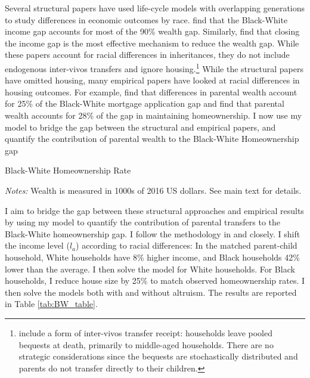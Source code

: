 \documentclass[12pt]{article}
\begin{document}
Several structural papers have used life-cycle models with overlapping generations to study differences in economic outcomes by race. \cite{Ashman2020} find that the Black-White income gap accounts for most of the 90\% wealth gap. Similarly, \cite{aliprantis2022dynamics} find that closing the income gap is the most effective mechanism to reduce the wealth gap. While these papers account for racial differences in inheritances, they do not include endogenous inter-vivos transfers and ignore housing.\footnote{\cite{aliprantis2022dynamics} include a form of inter-vivos transfer receipt: households leave pooled bequests at death, primarily to middle-aged households. There are no strategic considerations since the bequests are stochastically distributed and parents do not transfer directly to their children.} While the structural papers have omitted housing, many empirical papers have looked at racial differences in housing outcomes. For example, \cite{charles2002transition} find that differences in parental wealth account for 25\% of the Black-White mortgage application gap and \cite{bond2021role} find that parental wealth accounts for 28\% of the gap in maintaining homeownership. I now use my model to bridge the gap between the structural and empirical papers, and quantify the contribution of parental wealth to the Black-White Homeownership gap
\begin{table}
	\center
\begin{threeparttable}[tb]
				\singlespacing
		\caption{Black-White Homeownership Rate}\label{tab:BW_table}
		
		\footnotesize
		\textit{Notes:} Wealth is measured in 1000s of 2016 US dollars. See main text for details.
	\end{threeparttable}
\end{table}


I aim to bridge the gap between these structural approaches and empirical results by using my model to quantify  the contribution of parental transfers to the Black-White homeownership gap. I follow the methodology in \cite{Ashman2020} and \cite{aliprantis2022dynamics} closely. I shift the income level ($l_a$) according to racial differences: In the matched parent-child household, White households have 8\% higher income, and Black households 42\% lower than the average. I then solve the model for White households. For Black households, I reduce house size by 25\% to match observed homeownership rates. I then solve the models both with and without altruism. The results are reported in Table \ref{tab:BW_table}. 
\end{document}
